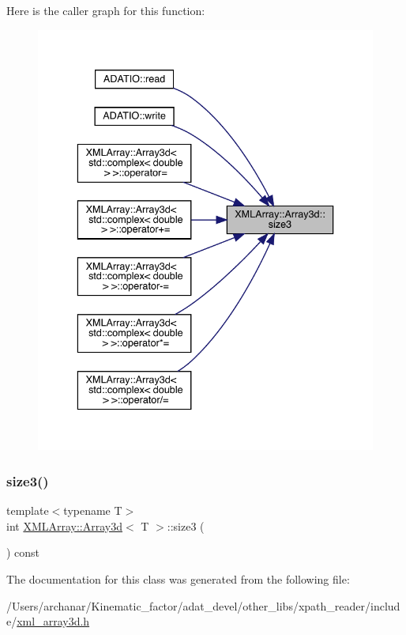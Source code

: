 Here is the caller graph for this function\+:\nopagebreak
\begin{figure}[H]
\begin{center}
\leavevmode
\includegraphics[width=336pt]{db/da0/classXMLArray_1_1Array3d_acd75aac75b08156dddab9c76dd3ebf33_icgraph}
\end{center}
\end{figure}
\mbox{\label{classXMLArray_1_1Array3d_acd75aac75b08156dddab9c76dd3ebf33}} 
\subsubsection{\texorpdfstring{size3()}{size3()}\hspace{0.1cm}{\footnotesize\ttfamily [2/2]}}
{\footnotesize\ttfamily template$<$typename T$>$ \\
int \mbox{\hyperlink{classXMLArray_1_1Array3d}{X\+M\+L\+Array\+::\+Array3d}}$<$ T $>$\+::size3 (\begin{DoxyParamCaption}{ }\end{DoxyParamCaption}) const\hspace{0.3cm}{\ttfamily [inline]}}



The documentation for this class was generated from the following file\+:\begin{DoxyCompactItemize}
\item 
/\+Users/archanar/\+Kinematic\+\_\+factor/adat\+\_\+devel/other\+\_\+libs/xpath\+\_\+reader/include/\mbox{\hyperlink{other__libs_2xpath__reader_2include_2xml__array3d_8h}{xml\+\_\+array3d.\+h}}\end{DoxyCompactItemize}
